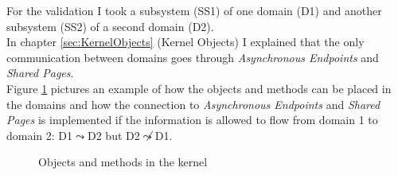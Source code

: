 For the validation I took a subsystem (SS1) of one domain (D1) and another subsystem (SS2) of a second domain (D2). \\
In chapter \ref{sec:KernelObjects} (Kernel Objects) I explained that the only communication between domains goes through \textit{Asynchronous Endpoints} and \textit{Shared Pages}. \\
Figure \ref{overview} pictures an example of how the objects and methods can be placed in the domains and how the connection to \textit{Asynchronous Endpoints} and \textit{Shared Pages} is implemented if the information is allowed to flow from domain 1 to domain 2: D1$\leadsto$D2 but D2$\not\leadsto$D1.
\begin{flushleft}
\begin{figure}[H]
\caption{Objects and methods in the kernel}
\label{overview}
\end{figure}
\end{flushleft}
